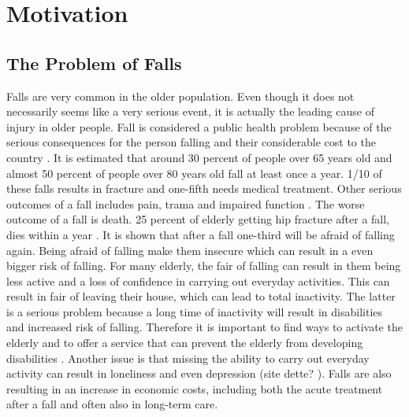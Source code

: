 \chapter{Motivation}

\section{The Problem of Falls}
Falls are very common in the older population. Even though it does not necessarily seems like a very serious event, it is actually the leading cause of injury in older people.  Fall is considered a public health problem because of the serious consequences for the person falling and their considerable cost to the country \cite{otago}.
It is estimated that around 30 percent of people over 65 years old and almost 50 percent of people over 80 years old fall at least once a year. 1/10 of these falls results in fracture and one-fifth needs medical treatment. Other serious outcomes of a fall includes pain, trama and impaired function \cite{otago}.  The worse outcome of a fall is death. 25 percent of elderly getting hip fracture after a fall, dies within a year \cite{gruppetrening-trheim} \cite{larhalsbrudd}. It is shown that after a fall one-third will be afraid of falling again. Being afraid of falling make them insecure which can result in a even bigger risk of falling. For many elderly, the fair of falling can result in them being less active and a loss of confidence in carrying out everyday activities. This can result in fair of leaving their house, which can lead to total inactivity. The latter is a serious problem because a long time of inactivity will result in disabilities and increased risk of falling. Therefore it is important to find ways to activate the elderly and to offer a service that can prevent the elderly from developing disabilities \cite{gruppetrening-trheim}. Another issue is that missing the ability to carry out everyday activity can result in loneliness and even depression (site dette? ). Falls are also resulting in an increase in economic costs, including both the acute treatment after a fall and often also in long-term care. \cite{otago}\\ \\

